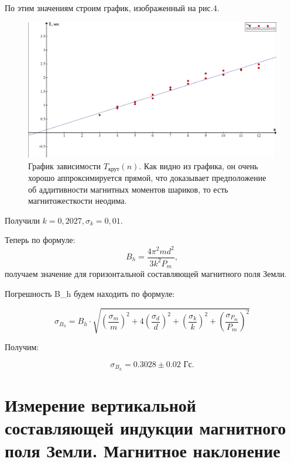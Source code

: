 \documentclass[a4paper, 14pt]{extarticle}%
\newcommand\ECaption[1]{%
     \captionsetup{font=footnotesize}%
     \caption{#1}}
\newcommand\ECaption[1]{%
     \captionsetup{font=footnotesize}%
     \caption{#1}}
\begin{document}
По этим значениям строим график, изображенный на рис.4.

\begin{figure}[h!]
\begin{center}
\includegraphics[width=1 \textwidth]{lab1231.png}
\end{center}
\ECaption{График зависимости $T_{\text{крут}}(n)$. Как видно из графика, он очень хорошо аппроксимируется прямой, что доказывает предположение об аддитивности магнитных моментов шариков, то есть магнитожесткости неодима. }
\end{figure}

Получили $k = 0,2027, \sigma_k = 0,01$.

Теперь по формуле:
\[B_h = \dfrac{4\pi^2md^2}{3k^2P_m},\]
получаем значение для горизонтальной составляющей магнитного поля Земли.

Погрешность B_h будем находить по формуле:

\begin{equation}
\sigma_{B_h} = B_h\cdot\sqrt{ (\frac{\sigma_m}{m})^2  +  4(\frac{\sigma_d}{d})^2  +  (\frac{\sigma_k}{k})^2  +  (\frac{\sigma_{P_m}}{P_m})^2 }
\end{equation}

Получим:

\[\sigma_{B_h} = 0.3028\pm 0.02 \text{ Гс}.\]


\newpage

\section{Измерение вертикальной составляющей
индукции магнитного поля Земли.
Магнитное наклонение}
\end{document}
